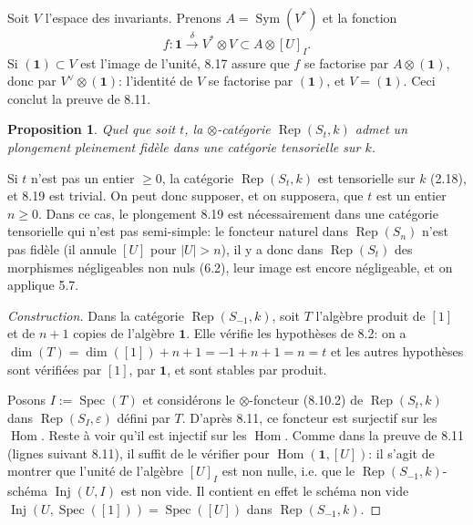 \documentclass[11pt,a4paper]{article}
\theoremstyle{plain}
\newtheorem{proposition}[theorem]{Proposition}
\theoremstyle{definition}
\DeclareMathOperator{\Hom}{Hom}
\DeclareMathOperator{\Spec}{Spec}
\DeclareMathOperator{\Sym}{Sym}
\DeclareMathOperator{\Rep}{Rep}
\DeclareMathOperator{\Inj}{Inj}
\newcommand{\eps}{\varepsilon}
\begin{document}
Soit $V$ l'espace des invariants. Prenons $A = \Sym(V^*)$ et la fonction
\[
f : \mathbf{1} \xrightarrow{\delta} V^* \otimes V \subset A \otimes [U]_I.
\]
Si $(\mathbf{1}) \subset V$ est l'image de l'unit\'e, 8.17 assure que $f$ se factorise par $A \otimes (\mathbf{1})$, donc par $V^\vee \otimes (\mathbf{1})$: l'identit\'e de $V$ se factorise par $(\mathbf{1})$, et $V = (\mathbf{1})$. Ceci conclut la preuve de 8.11.

\begin{proposition}
Quel que soit $t$, la $\otimes$-cat\'egorie $\Rep(S_t, k)$ admet un plongement pleinement fid\`ele dans une cat\'egorie tensorielle sur $k$.
\end{proposition}

Si $t$ n'est pas un entier $\geq 0$, la cat\'egorie $\Rep(S_t, k)$ est tensorielle sur $k$ (2.18), et 8.19 est trivial. On peut donc supposer, et on supposera, que $t$ est un entier $n \geq 0$. Dans ce cas, le plongement 8.19 est n\'ecessairement dans une cat\'egorie tensorielle qui n'est pas semi-simple: le foncteur naturel dans $\Rep(S_n)$ n'est pas fid\`ele (il annule $[U]$ pour $|U| > n$), il y a donc dans $\Rep(S_t)$ des morphismes n\'egligeables non nuls (6.2), leur image est encore n\'egligeable, et on applique 5.7.

\begin{proof}[Construction]
Dans la cat\'egorie $\Rep(S_{-1}, k)$, soit $T$ l'alg\`ebre produit de $[1]$ et de $n + 1$ copies de l'alg\`ebre $\mathbf{1}$. Elle v\'erifie les hypoth\`eses de 8.2: on a $\dim(T) = \dim([1]) + n + 1 = -1 + n + 1 = n = t$ et les autres hypoth\`eses sont v\'erifi\'ees par $[1]$, par $\mathbf{1}$, et sont stables par produit.

Posons $I := \Spec(T)$ et consid\'erons le $\otimes$-foncteur (8.10.2) de $\Rep(S_t, k)$ dans $\Rep(S_I, \eps)$ d\'efini par $T$. D'apr\`es 8.11, ce foncteur est surjectif sur les $\Hom$. Reste \`a voir qu'il est injectif sur les $\Hom$. Comme dans la preuve de 8.11 (lignes suivant 8.11), il suffit de le v\'erifier pour $\Hom(\mathbf{1}, [U])$: il s'agit de montrer que l'unit\'e de l'alg\`ebre $[U]_I$ est non nulle, i.e. que le $\Rep(S_{-1}, k)$-sch\'ema $\Inj(U, I)$ est non vide. Il contient en effet le sch\'ema non vide $\Inj(U, \Spec([1])) = \Spec([U])$ dans $\Rep(S_{-1}, k)$.
\end{proof}
\end{document}
